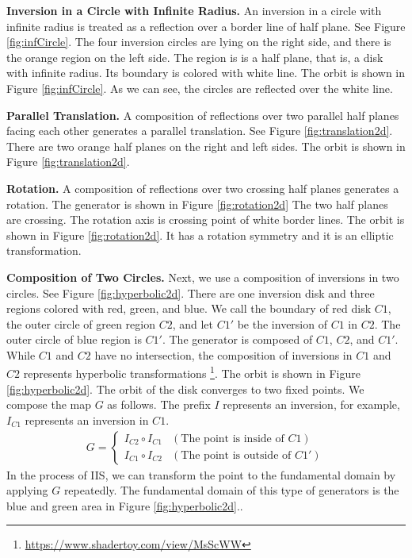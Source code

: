 \noindent\textbf{Inversion in a Circle with Infinite Radius.}
An inversion in a circle with infinite radius is treated as a reflection
over a border line of half plane. See Figure
\ref{fig:infCircle}.
The four inversion circles are lying on the right side, and there is the
orange region on the left side. The region is is a half plane, that is, a
disk with infinite radius. Its boundary is colored with white line.
The orbit is shown in
Figure \ref{fig:infCircle}.
As we can see, the circles are reflected over the white line.

\noindent\textbf{Parallel Translation.}
A composition of reflections over two parallel half planes facing each
other generates a parallel translation. See Figure
\ref{fig:translation2d}.
There are two orange half planes on the right and left sides.
The orbit is shown in Figure
\ref{fig:translation2d}.

\noindent\textbf{Rotation.}
A composition of reflections over two crossing half planes generates a
rotation. The generator is shown in Figure
\ref{fig:rotation2d}
The two half planes are crossing. The rotation axis is crossing point of
white border lines. The orbit is shown in Figure 
\ref{fig:rotation2d}.
It has a rotation symmetry and it is an elliptic transformation.

\noindent\textbf{Composition of Two Circles.}
 Next, we use a composition of inversions in two circles.
 See Figure \ref{fig:hyperbolic2d}.
 There are one inversion disk and three regions colored with red, green,
 and blue.
 We call the boundary of red disk $C1$, 
 the outer circle of green region $C2$, and
 let $C1'$ be the inversion of $C1$ in $C2$.
 The outer circle of blue region is $C1'$.
 The generator is composed of $C1$, $C2$, and $C1'$.
 While $C1$ and $C2$ have no intersection, the composition of inversions
 in $C1$ and $C2$ represents hyperbolic transformations
 \footnote{\url{https://www.shadertoy.com/view/MsScWW}}.
 The orbit is shown in Figure
 \ref{fig:hyperbolic2d}.
 The orbit of the disk converges to two fixed points.
 We compose the map $G$ as follows.
 The prefix $I$ represents an inversion, for example, $I_{C1}$ represents
 an inversion in $C1$.
 \begin{align*}
  G =
  \begin{cases}
   I_{C2} \circ I_{C1} & (\text{The point is inside of } C1) \\
   I_{C1} \circ I_{C2} & (\text{The point is outside of }C1')
  \end{cases}
 \end{align*}
 In the process of IIS, we can transform the point to the fundamental
 domain by applying $G$ repeatedly.
 The fundamental domain of this type of generators is the blue and green
 area in Figure \ref{fig:hyperbolic2d}..

